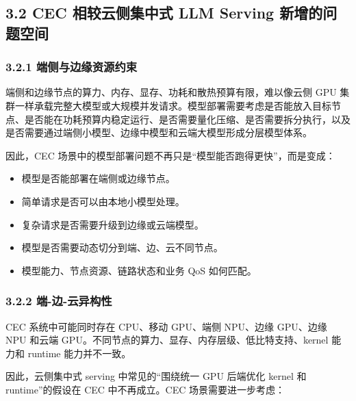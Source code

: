 \documentclass[a4paper,twocolumn,10pt]{ctexart}
\begin{document}
\subsection{3.2 CEC 相较云侧集中式 LLM Serving 新增的问题空间}



\subsubsection{3.2.1 端侧与边缘资源约束}



端侧和边缘节点的算力、内存、显存、功耗和散热预算有限，难以像云侧 GPU 集群一样承载完整大模型或大规模并发请求。模型部署需要考虑是否能放入目标节点、是否能在功耗预算内稳定运行、是否需要量化压缩、是否需要拆分执行，以及是否需要通过端侧小模型、边缘中模型和云端大模型形成分层模型体系。




因此，CEC 场景中的模型部署问题不再只是“模型能否跑得更快”，而是变成：




\begin{itemize}
\item 模型是否能部署在端侧或边缘节点。

\item 简单请求是否可以由本地小模型处理。

\item 复杂请求是否需要升级到边缘或云端模型。

\item 模型是否需要动态切分到端、边、云不同节点。

\item 模型能力、节点资源、链路状态和业务 QoS 如何匹配。



\end{itemize}




\subsubsection{3.2.2 端-边-云异构性}



CEC 系统中可能同时存在 CPU、移动 GPU、端侧 NPU、边缘 GPU、边缘 NPU 和云端 GPU。不同节点的算力、显存、内存层级、低比特支持、kernel 能力和 runtime 能力并不一致。




因此，云侧集中式 serving 中常见的“围绕统一 GPU 后端优化 kernel 和 runtime”的假设在 CEC 中不再成立。CEC 场景需要进一步考虑：
\end{document}

